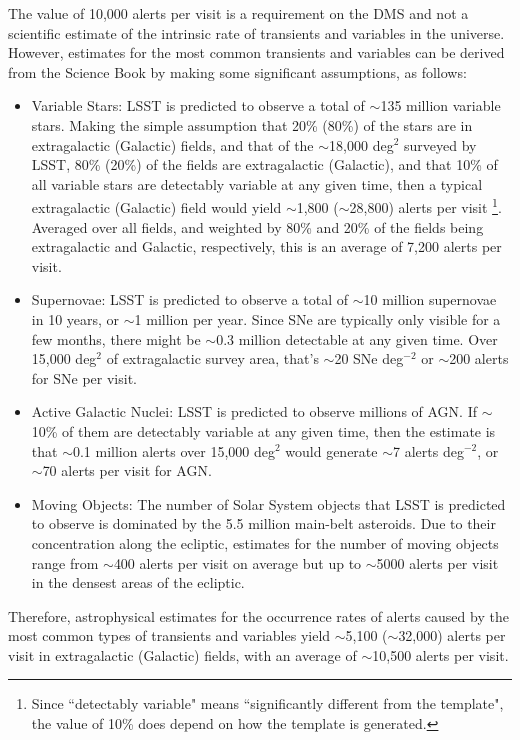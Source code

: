 \documentclass[DM,authoryear,toc]{lsstdoc}
\begin{document}
The value of 10,000 alerts per visit is a requirement on the \gls{DMS} and not a scientific estimate of the intrinsic rate of transients and variables in the universe. However, estimates for the most common transients and variables can be derived from the Science Book \citep{2009arXiv0912.0201L} by making some significant assumptions, as follows:
\begin{itemize}
\item Variable Stars: \gls{LSST} is predicted to observe a total of $\sim$135 million variable stars. Making the simple assumption that 20\% (80\%) of the stars are in extragalactic (Galactic) fields, and that of the $\sim$18,000 \gls{deg}$^2$ surveyed by \gls{LSST}, 80\% (20\%) of the fields are extragalactic (Galactic), and that 10\% of all variable stars are detectably variable at any given time, then a typical extragalactic (Galactic) field would yield $\sim$1,800 ($\sim$28,800) alerts per visit \footnote{Since ``detectably variable" means ``significantly different from the template", the value of 10\% does depend on how the template is generated.}. Averaged over all fields, and weighted by 80\% and 20\% of the fields being extragalactic and Galactic, respectively, this is an average of 7,200 alerts per visit.
\item Supernovae: \gls{LSST} is predicted to observe a total of $\sim$10 million supernovae in 10 years, or $\sim$1 million per year. Since SNe are typically only visible for a few months, there might be $\sim$0.3 million detectable at any given time. Over 15,000 \gls{deg}$^{2}$ of extragalactic survey area, that's $\sim$20 SNe \gls{deg}$^{-2}$ or $\sim$200 alerts for SNe per visit.
\item Active Galactic Nuclei: \gls{LSST} is predicted to observe millions of AGN. If $\sim$10\% of them are detectably variable at any given time, then the estimate is that $\sim$0.1 million alerts over 15,000 \gls{deg}$^2$ would generate $\sim$7 alerts \gls{deg}$^{-2}$, or $\sim$70 alerts per visit for AGN.
\item Moving Objects: The number of Solar System objects that \gls{LSST} is predicted to observe is dominated by the 5.5 million main-belt asteroids. Due to their concentration along the ecliptic, estimates for the number of moving objects range from $\sim$400 alerts per visit on average but up to $\sim$5000 alerts per visit in the densest areas of the ecliptic.
\end{itemize} 
Therefore, astrophysical estimates for the occurrence rates of alerts caused by the most common types of transients and variables yield $\sim$5,100 ($\sim$32,000) alerts per visit in extragalactic (Galactic) fields, with an average of $\sim$10,500 alerts per visit.
\end{document}
